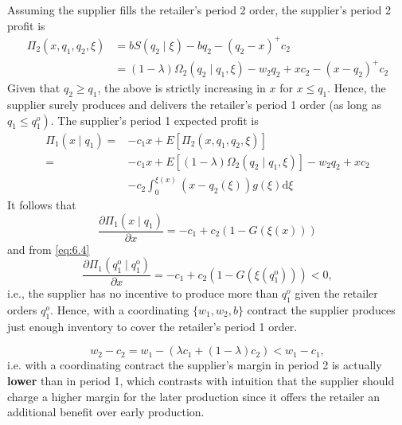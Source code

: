 Assuming the supplier fills the retailer's period 2 order, the supplier's period 2 profit is 
$$
\begin{aligned}
\Pi_{2}\left(x, q_{1}, q_{2}, \xi\right) &=b S\left(q_{2} \mid \xi\right)-b q_{2}-\left(q_{2}-x\right)^{+} c_{2} \\
&=(1-\lambda) \Omega_{2}\left(q_{2} \mid q_{1}, \xi\right)-w_{2} q_{2}+x c_{2}-\left(x-q_{2}\right)^{+} c_{2}
\end{aligned}
$$
Given that $q_{2} \geq q_{1}$, the above is strictly increasing in $x$ for $x \leq q_{1}$. Hence, the supplier surely produces and delivers the retailer's period 1 order (as long as $\left.q_{1} \leq q_{1}^{o}\right)$. The supplier's period 1 expected profit is
$$
\begin{aligned}
\Pi_{1}\left(x \mid q_{1}\right)=&-c_{1} x+E\left[\Pi_{2}\left(x, q_{1}, q_{2}, \xi\right)\right] \\
=&-c_{1} x+E\left[(1-\lambda) \Omega_{2}\left(q_{2} \mid q_{1}, \xi\right)\right]-w_{2} q_{2}+x c_{2} \\
&-c_{2} \int_{0}^{\xi(x)}\left(x-q_{2}(\xi)\right) g(\xi) \mathrm{d} \xi
\end{aligned}
$$
It follows that
$$
\frac{\partial \Pi_{1}\left(x \mid q_{1}\right)}{\partial x}=-c_{1}+c_{2}(1-G(\xi(x)))
$$
and from \autoref{eq:6.4}
$$
\frac{\partial \Pi_{1}\left(q_{1}^{\mathrm{o}} \mid q_{1}^{\mathrm{o}}\right)}{\partial x}=-c_{1}+c_{2}\left(1-G\left(\xi\left(q_{1}^{\mathrm{o}}\right)\right)\right)<0 ,
$$
i.e., the supplier has no incentive to produce more than $q_1^o$ given the retailer orders $q_1^o$. Hence, with a coordinating $\{w_1,w_2,b\}$ contract the supplier produces just enough inventory to cover the retailer's period 1 order. 
\begin{note}
    $$w_2-c_2=w_1-(\lambda c_1+(1-\lambda)c_2)<w_1-c_1,$$
    i.e. with a coordinating contract the supplier's margin in period 2 is actually \textbf{lower} than in period 1, which contrasts with intuition that the supplier should charge a higher margin for the later production since it offers the retailer an additional benefit over early production.
\end{note}





